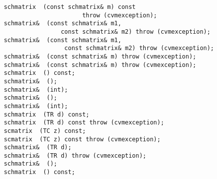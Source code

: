 \verb"    schmatrix "\verb" (const schmatrix& m) const"\\
\verb"                          throw (cvmexception);"\\
\verb"    schmatrix& "\verb" (const schmatrix& m1,"\\
\verb"                    const schmatrix& m2) throw (cvmexception);"\\
\verb"    schmatrix& "\verb" (const schmatrix& m1,"\\
\verb"                     const schmatrix& m2) throw (cvmexception);"\\
\verb"    schmatrix& "\verb" (const schmatrix& m) throw (cvmexception);"\\
\verb"    schmatrix& "\verb" (const schmatrix& m) throw (cvmexception);"\\
\verb"    schmatrix "\verb" () const;"\\
\verb"    schmatrix& "\verb" ();"\\
\verb"    schmatrix& "\verb" (int);"\\
\verb"    schmatrix& "\verb" ();"\\
\verb"    schmatrix& "\verb" (int);"\\
\verb"    schmatrix "\verb" (TR d) const;"\\
\verb"    schmatrix "\verb" (TR d) const throw (cvmexception);"\\
\verb"    scmatrix "\verb" (TC z) const;"\\
\verb"    scmatrix "\verb" (TC z) const throw (cvmexception);"\\
\verb"    schmatrix& "\verb" (TR d);"\\
\verb"    schmatrix& "\verb" (TR d) throw (cvmexception);"\\
\verb"    schmatrix& "\verb" ();"\\
\verb"    schmatrix "\verb" () const;"\\
